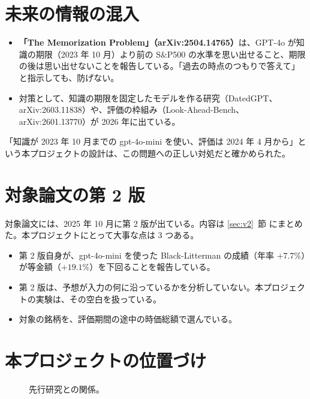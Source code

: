 \documentclass[xelatex,ja=standard,jafont=hiragino-pron,a4paper,10pt]{bxjsreport}
\newcommand{\SP}{S\&P500}
\newcommand{\secref}[1]{\ref{#1}~節}
\begin{document}
\section{未来の情報の混入}

\begin{itemize}
\item \textbf{「The Memorization Problem」（arXiv:2504.14765）}は、GPT-4o が知識の期限（2023 年 10 月）より前の \SP{} の水準を思い出せること、期限の後は思い出せないことを報告している。「過去の時点のつもりで答えて」と指示しても、防げない。
\item 対策として、知識の期限を固定したモデルを作る研究（DatedGPT、arXiv:2603.11838）や、評価の枠組み（Look-Ahead-Bench、arXiv:2601.13770）が 2026 年に出ている。
\end{itemize}

「知識が 2023 年 10 月までの gpt-4o-mini を使い、評価は 2024 年 4 月から」という本プロジェクトの設計は、この問題への正しい対処だと確かめられた。

\section{対象論文の第 2 版}

対象論文には、2025 年 10 月に第 2 版が出ている。内容は \secref{sec:v2} にまとめた。本プロジェクトにとって大事な点は 3 つある。

\begin{itemize}
\item 第 2 版自身が、gpt-4o-mini を使った Black-Litterman の成績（年率 $+7.7\%$）が等金額（$+19.1\%$）を下回ることを報告している。
\item 第 2 版は、予想が入力の何に沿っているかを分析していない。本プロジェクトの実験は、その空白を扱っている。
\item 対象の銘柄を、評価期間の途中の時価総額で選んでいる。
\end{itemize}

\section{本プロジェクトの位置づけ}

\begin{figure}[htbp]
\centering
{}
\caption{先行研究との関係。}
\end{figure}
\end{document}
